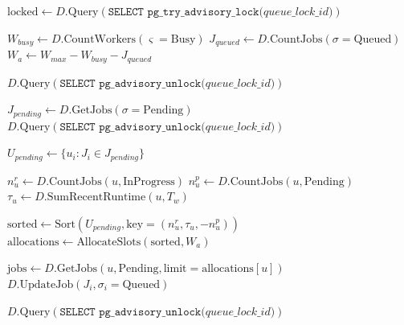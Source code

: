 \documentclass[11pt]{article}
\begin{document}
\begin{algorithm}[H]
\caption{Fair Job Queueing (Server-Side)}
\begin{algorithmic}[1]

  \State {}
  \State $\text{locked} \gets D.\text{Query}(\texttt{SELECT pg\_try\_advisory\_lock(}
    \textit{queue\_lock\_id}\texttt{)})$
    \State \Return
  \EndIf

  \State {}

  \State {}
  \State $W_{busy} \gets D.\text{CountWorkers}(\varsigma = \text{Busy})$
  \State $J_{queued} \gets D.\text{CountJobs}(\sigma = \text{Queued})$
  \State $W_a \gets W_{max} - W_{busy} - J_{queued}$

    \State $D.\text{Query}(\texttt{SELECT pg\_advisory\_unlock(}\textit{queue\_lock\_id}\texttt{)})$
    \State \Return
  \EndIf

  \State $J_{pending} \gets D.\text{GetJobs}(\sigma = \text{Pending})$
    \State $D.\text{Query}(\texttt{SELECT pg\_advisory\_unlock(}\textit{queue\_lock\_id}\texttt{)})$
    \State \Return
  \EndIf

  \State {}
  \State $U_{pending} \gets \{u_i : J_i \in J_{pending}\}$

    \State $n_u^r \gets D.\text{CountJobs}(u, \text{InProgress})$
    \State $n_u^p \gets D.\text{CountJobs}(u, \text{Pending})$
    \State $\tau_u \gets D.\text{SumRecentRuntime}(u, T_w)$
  \EndFor

  \State $\text{sorted} \gets \text{Sort}(U_{pending}, \text{key} = (n_u^r, \tau_u, -n_u^p))$
  \State $\text{allocations} \gets \text{AllocateSlots}(\text{sorted}, W_a)$

  \State {}
    \State $\text{jobs} \gets D.\text{GetJobs}(u, \text{Pending}, \text{limit} = \text{allocations}[u])$
      \State $D.\text{UpdateJob}(J_i, \sigma_i = \text{Queued})$
    \EndFor
  \EndFor

  \State $D.\text{Query}(\texttt{SELECT pg\_advisory\_unlock(}\textit{queue\_lock\_id}\texttt{)})$

\EndProcedure
\end{algorithmic}
\end{algorithm}
\end{document}
